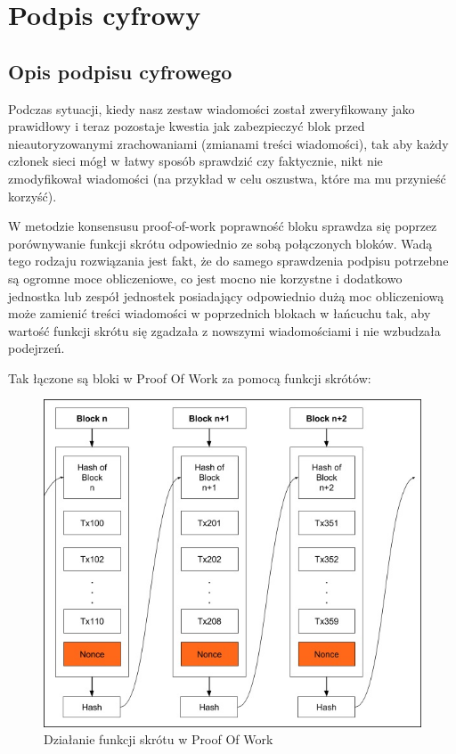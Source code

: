 \section{Podpis cyfrowy}
\label{sec:PodpisCyfrowy}
\subsection{Opis podpisu cyfrowego}
\label{sec:PodpisCyfrowyOpis}
Podczas sytuacji, kiedy nasz zestaw wiadomości został zweryfikowany jako prawidłowy i teraz pozostaje kwestia jak zabezpieczyć blok przed nieautoryzowanymi zrachowaniami (zmianami treści wiadomości), tak aby każdy członek sieci mógł w łatwy sposób sprawdzić czy faktycznie, nikt nie zmodyfikował wiadomości (na przykład w celu oszustwa, które ma mu przynieść korzyść).

\vspace{1em}

W metodzie konsensusu proof-of-work poprawność bloku sprawdza się poprzez porównywanie funkcji skrótu odpowiednio ze sobą połączonych bloków. Wadą tego rodzaju rozwiązania jest fakt, że do samego sprawdzenia podpisu potrzebne są ogromne moce obliczeniowe, co jest mocno nie korzystne i dodatkowo jednostka lub zespół jednostek posiadający odpowiednio dużą moc obliczeniową może zamienić treści wiadomości w poprzednich blokach w łańcuchu tak, aby wartość funkcji skrótu się zgadzała z nowszymi wiadomościami i nie wzbudzała podejrzeń.

\vspace{1em}

Tak łączone są bloki w Proof Of Work za pomocą funkcji skrótów:
\begin{figure}[H]
    \centering
    \includegraphics[width=\textwidth]{Images/ProofOfWorkHash.jpg}
    \caption{Działanie funkcji skrótu w Proof Of Work}
    \label{fig:ProofOfWorkHash}
\end{figure}

